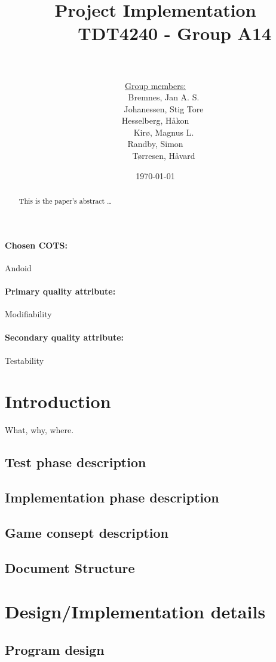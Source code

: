 \documentclass[12pt, a4paper]{article}
\title{
	Project Implementation \\
    TDT4240 - Group A14 \\
	\\
}
\author{
	\underline{Group members:} \\
    Bremnes, Jan A. S.\\
    Johanessen, Stig Tore\\
	Hesselberg, Håkon \\
    Kirø, Magnus L.\\
	Randby, Simon \\
    Tørresen, Håvard\\
}
\date{\today}
\begin{document}
\maketitle
\paragraph{Chosen COTS:} Andoid
\paragraph{Primary quality attribute:} Modifiability
\paragraph{Secondary quality attribute:} Testability \\


\begin{abstract}
This is the paper's abstract \ldots
\end{abstract}

\newpage
\tableofcontents
\newpage

\section{Introduction}
What, why, where.
\subsection{Test phase description}
\subsection{Implementation phase description}
\subsection{Game consept description}
\subsection{Document Structure}

\section{Design/Implementation details}
\subsection{Program design}
\end{document}
